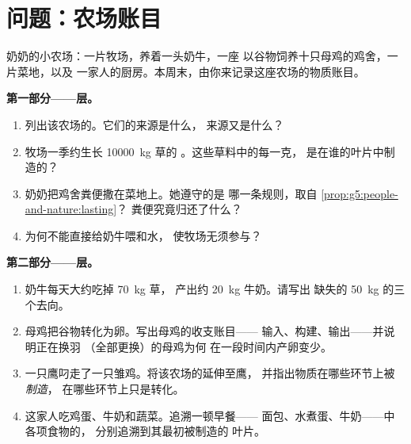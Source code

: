 \section{问题：农场账目}

\begin{problem}\label{pb:g6:matter-from-food:1}
奶奶的小农场：一片牧场，养着一头奶牛，一座
以谷物饲养十只母鸡的鸡舍，一片菜地，以及
一家人的厨房。本周末，由你来记录这座农场的物质账目。

\medskip\noindent\textbf{第一部分——层。}
\begin{enumerate}
  \item 列出该农场的。它们的来源是什么，
        来源又是什么？
  \item 牧场一季约生长 \qty{10000}{kg} 草的
        。这些草料中的每一克，
        是在谁的叶片中制造的？
  \item 奶奶把鸡舍粪便撒在菜地上。她遵守的是
        哪一条规则，取自
        \cref{prop:g5:people-and-nature:lasting}？
        粪便究竟归还了什么？
  \item 为何不能直接给奶牛喂和水，
        使牧场无须参与？
\end{enumerate}

\medskip\noindent\textbf{第二部分——层。}
\begin{enumerate}[resume]
  \item 奶牛每天大约吃掉 \qty{70}{kg} 草，
        产出约 \qty{20}{kg} 牛奶。请写出
        缺失的 \qty{50}{kg} 的三个去向。
  \item 母鸡把谷物转化为卵。写出母鸡的收支账目——
        输入、构建、输出——并说明正在换羽
        （全部更换）的母鸡为何
        在一段时间内产卵变少。
  \item 一只鹰叼走了一只雏鸡。将该农场的延伸至鹰，
        并指出物质在哪些环节上被\emph{制造}，
        在哪些环节上只是转化。
  \item 这家人吃鸡蛋、牛奶和蔬菜。追溯一顿早餐——
        面包、水煮蛋、牛奶——中各项食物的，
        分别追溯到其最初被制造的
        叶片。
\end{enumerate}


\end{problem}
